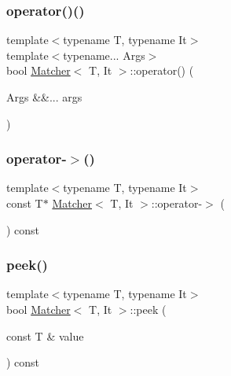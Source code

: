 \mbox{\label{class_matcher_a2c1cbd69f6fcbbcf40e9e66333cfddca}} 
\subsubsection{\texorpdfstring{operator()()}{operator()()}}
{\footnotesize\ttfamily template$<$typename T, typename It$>$ \\
template$<$typename... Args$>$ \\
bool \hyperlink{class_matcher}{Matcher}$<$ T, It $>$\+::operator() (\begin{DoxyParamCaption}\item[{Args \&\&...}]{args }\end{DoxyParamCaption})\hspace{0.3cm}{\ttfamily [inline]}}

\mbox{\label{class_matcher_a3613bf19482915302d6647e25d9facb2}} 
\subsubsection{\texorpdfstring{operator-\/$>$()}{operator->()}}
{\footnotesize\ttfamily template$<$typename T, typename It$>$ \\
const T$\ast$ \hyperlink{class_matcher}{Matcher}$<$ T, It $>$\+::operator-\/$>$ (\begin{DoxyParamCaption}{ }\end{DoxyParamCaption}) const\hspace{0.3cm}{\ttfamily [inline]}}

\mbox{\label{class_matcher_a28b154cbc4cb7ae203810043e069ae38}} 
\subsubsection{\texorpdfstring{peek()}{peek()}\hspace{0.1cm}{\footnotesize\ttfamily [1/2]}}
{\footnotesize\ttfamily template$<$typename T, typename It$>$ \\
bool \hyperlink{class_matcher}{Matcher}$<$ T, It $>$\+::peek (\begin{DoxyParamCaption}\item[{const T \&}]{value }\end{DoxyParamCaption}) const\hspace{0.3cm}{\ttfamily [inline]}}


